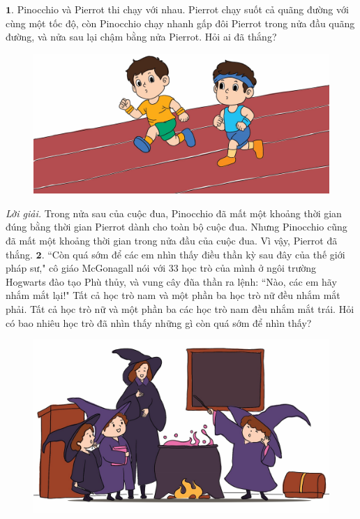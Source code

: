 \begin{multicols}{2}
	$\pmb{1.}$	Pinocchio và Pierrot thi chạy với nhau. Pierrot chạy suốt cả quãng đường với cùng một tốc độ, còn Pinocchio chạy nhanh gấp đôi Pierrot trong nửa đầu quãng đường, và nửa sau lại chậm bằng nửa Pierrot. Hỏi ai đã thắng?
	\begin{figure}[H]
		\centering
		\vspace*{-5pt}
		\captionsetup{labelformat= empty, justification=centering}
		\includegraphics[width=1\linewidth]{Pi4_bai1}
		\vspace*{-15pt}
	\end{figure}
	\textit{Lời giải.} Trong nửa sau của cuộc đua, Pinocchio đã mất một khoảng thời gian đúng bằng thời gian Pierrot dành cho toàn bộ cuộc đua. Nhưng Pinocchio cũng đã mất một khoảng thời gian trong nửa đầu của cuộc đua. Vì vậy, Pierrot đã thắng. 
	\vskip 0.1cm
	$\pmb{2.}$ ``Còn quá sớm để các em nhìn thấy điều thần kỳ sau đây của thế giới pháp sư," cô giáo McGonagall  nói với $33$ học trò của mình ở ngôi trường Hogwarts đào tạo Phù thủy, và vung cây đũa thần ra lệnh: ``Nào, các em hãy nhắm mắt lại!" Tất cả học trò nam và một phần ba học trò nữ đều nhắm mắt phải. Tất cả học trò nữ và một phần ba các học trò nam đều nhắm mắt trái. Hỏi có bao nhiêu học trò đã nhìn thấy những gì còn quá sớm để nhìn thấy?
	\begin{figure}[H]
		\centering
		\vspace*{-10pt}
		\captionsetup{labelformat= empty, justification=centering}
		\includegraphics[width=1\linewidth]{Pi4_bai2}

\end{figure}
\end{multicols}
